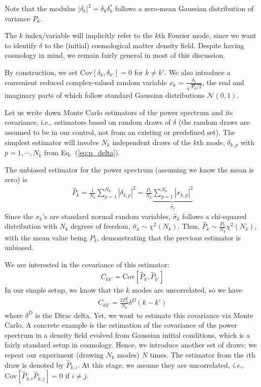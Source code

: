 \documentclass{aastex6}
\newcommand{\ie}{{\textit{i.e.,}~}}
\newcommand{\equref}[1]{{\xspace}Eq.~(\ref{#1})}
\newcommand{\eqn}[1]{\begin{eqnarray}#1\end{eqnarray}}
\begin{document}
Note that the modulus $|\delta_k|^2 = \delta_k \delta_k^*$ follows a zero-mean Gaussian distribution of variance $P_k$.

The $k$ index/variable will implicitly refer to the $k$th Fourier mode, since we want to identify $\delta$ to the (initial) cosmological matter density field. Despite having cosmology in mind, we remain fairly general in most of this discussion.

By construction, we set $\mathrm{Cov}[\delta_k, \delta_{k'}] = 0$ for $k\neq k'$. We also introduce a convenient reduced complex-valued random variable $x_k = \frac{\delta_k}{\sqrt{P_k/2}}$, the real and imaginary parts of which follow standard Gaussian distributions $\mathcal{N}(0, 1)$.

Let us write down Monte Carlo estimators of the power spectrum and its covariance, i.e., estimators based on random draws of $\delta$ (the random draws are assumed to be in our control, not from an existing or predefined set). The simplest estimator will involve $N_k$ independent draws of the $k$th mode, $\delta_{k,p}$ with $p=1, \cdots, N_k$ from \equref{eq:p_delta}. 

The unbiased estimator for the power spectrum (assuming we know the mean is zero) is
\eqn{
	\hat{P}_{k} = \frac{1}{N_k} \sum_{p=1}^{N_k} |\delta_{k,p}|^2 =\frac{P_k}{N_k } \underbrace{\sum_{p=1}^{N_k} |x_{k,p}|^2 }_{\hat{\sigma}_k}
}
Since the $x_k$'s are standard normal random variables, $\hat{\sigma}_k$ follows a chi-squared distribution with $N_k$ degrees of freedom, $\hat{\sigma}_k \sim \chi^2(N_k)$. 
Thus, $\hat{P}_{k} \sim \frac{P_k}{N_k }  \chi^2(N_k)$, with the mean value being $P_k$, demonstrating that the previous estimator is unbiased.

We are interested in the covariance of this estimator:
\eqn{
	C_{kk'} = \mathrm{Cov}[\hat{P}_{k}, \hat{P}_{k'}]
}
In our simple setup, we know that the $k$ modes are uncorrelated, so we have
\eqn{
	C_{kk'} = \frac{2{P}^2_{k}}{N_k} \delta^D(k-k')
}
where $ \delta^D$ is the Dirac delta. Yet, we want to estimate this covariance via Monte Carlo.
A concrete example is the estimation of the covariance of the power spectrum in a density field evolved from Gaussian initial conditions, which is a fairly standard setup in cosmology.
Hence, we introduce another set of draws: we repeat our experiment (drawing $N_k$ modes) $N$ times. The estimator from the $i$th draw is denoted by $\hat{P}_{k, i}$. 
At this stage, we assume they are uncorrelated, \ie $\mathrm{Cov}[\hat{P}_{k, i}\hat{P}_{k, j}] = 0$ if $i\neq j$.
\end{document}
